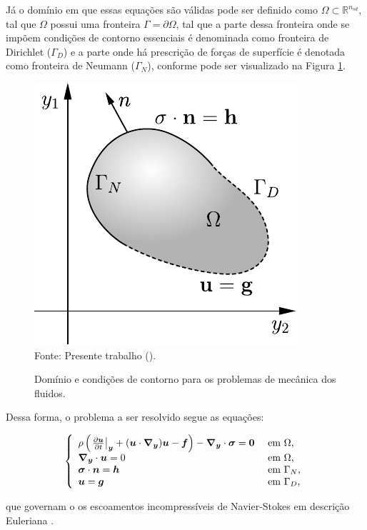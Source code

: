Já o domínio em que essas equações são válidas pode ser definido como $\Omega\subset\mathbb{R}^{n_{sd}}$, tal que $\Omega$ possui uma fronteira $\Gamma=\partial\Omega$, tal que a parte dessa fronteira onde se impõem condições de contorno essenciais é denominada como fronteira de Dirichlet ($\Gamma_D$) e a parte onde há prescrição de forças de superfície é denotada como fronteira de Neumann ($\Gamma_N$), conforme pode ser visualizado na Figura \ref{fig:Dom}.

\begin{figure}[h!]
    \centering
    \caption{Domínio e condições de contorno para os problemas de mecânica dos fluidos.}
    \includegraphics[width=.35\linewidth]{Figuras/Dom}
    \\Fonte: Presente trabalho (\the\year).
    \label{fig:Dom}
\end{figure}

Dessa forma, o problema a ser resolvido segue as equações:

\begin{equation}
    \left\{
    \begin{array}{ll}
        \rho\left({\left.\frac{\partial \boldsymbol{u}}{\partial t}\right|_{\boldsymbol{y}}+(\boldsymbol{u}\cdot\boldsymbol{\nabla_y})\boldsymbol{u}-\boldsymbol{f}}\right)-\boldsymbol{\nabla_y}\cdot\boldsymbol{\sigma}=\boldsymbol{0} & \text{ em }\Omega\text{,}   \\
        \boldsymbol{\nabla_y}\cdot\boldsymbol{u}=0                                                               & \text{ em }\Omega\text{,}   \\
        \boldsymbol{\sigma}\cdot\boldsymbol{n}=\boldsymbol{h}                                                        & \text{ em }\Gamma_N\text{,} \\
        \boldsymbol{u}=\boldsymbol{g}                                                                  & \text{ em }\Gamma_D\text{,}
    \end{array}
    \right.
    \label{eq:NS-Euler}
\end{equation}

\noindent que governam o os escoamentos incompressíveis de Navier-Stokes em descrição Euleriana \cite{bazilevs2013computational,bazilevs2010large,bazilevs2007variational,hughes2002variational,hughes2000large}.

